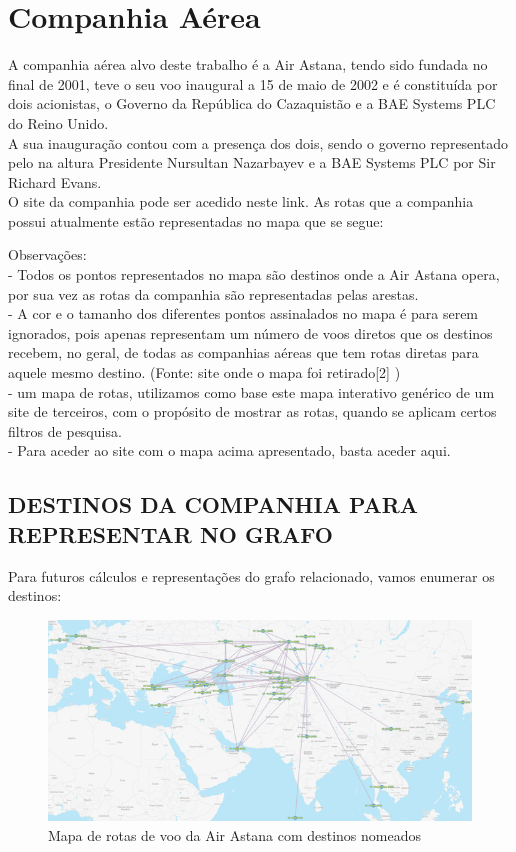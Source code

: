 \chapter{Companhia Aérea}
\label{chapter:Companhia Aérea}
A companhia aérea alvo deste trabalho é a Air Astana, tendo sido fundada no final de 2001, teve o seu voo 
inaugural a 15 de maio de 2002 e é constituída por dois acionistas, o Governo da República do Cazaquistão e a 
BAE Systems PLC do Reino Unido.\\
A sua inauguração contou com a presença dos dois, sendo o governo 
representado pelo na altura Presidente Nursultan Nazarbayev e a BAE Systems PLC por Sir Richard Evans.\\
O site da companhia pode ser acedido neste link.
As rotas que a companhia possui atualmente estão representadas no mapa que se segue:


Observações:\\
- Todos os pontos representados no mapa são destinos onde a Air Astana opera, por sua vez as rotas da 
companhia são representadas pelas arestas.\\
- A cor e o tamanho dos diferentes pontos assinalados no mapa é para serem ignorados, pois apenas 
representam um número de voos diretos que os destinos recebem, no geral, de todas as companhias aéreas 
que tem rotas diretas para aquele mesmo destino. (Fonte: site onde o mapa foi retirado[2]
)\\
- um mapa de rotas, utilizamos como base este mapa interativo genérico de um site de terceiros, com o 
propósito de mostrar as rotas, quando se aplicam certos filtros de pesquisa.\\
- Para aceder ao site com o mapa acima apresentado, basta aceder aqui.\\
\section{DESTINOS DA COMPANHIA PARA REPRESENTAR NO GRAFO}
Para futuros cálculos e representações do grafo relacionado, vamos enumerar os destinos:\\

\begin{figure}[h]
    \centering
    \includegraphics[width=1\textwidth]{imgs/Figura 2}
    \caption{Mapa de rotas de voo da Air Astana com destinos nomeados}
    \label{fig:}
\end{figure}


